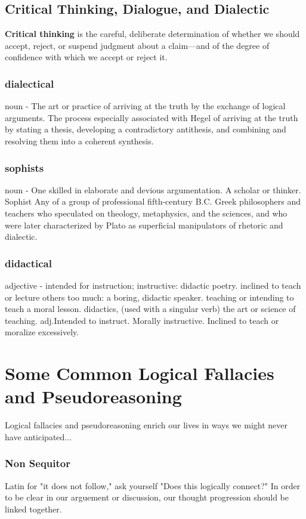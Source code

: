 \subsection{Critical Thinking, Dialogue, and Dialectic}

\textbf{Critical thinking} is the careful, deliberate determination of whether we should accept, reject, or suspend judgment about a claim---and of the degree of confidence with which we accept or reject it.

\subsubsection{dialectical}
noun - The art or practice of arriving at the truth by the exchange of logical arguments.
The process especially associated with Hegel of arriving at the truth by stating a thesis, developing a contradictory antithesis, and combining and resolving them into a coherent synthesis.
\subsubsection{sophists}
noun - One skilled in elaborate and devious argumentation. A scholar or thinker.
Sophist Any of a group of professional fifth-century B.C. Greek philosophers and teachers who speculated on theology, metaphysics, and the sciences, and who were later characterized by Plato as superficial manipulators of rhetoric and dialectic.
\subsubsection{didactical}
adjective - intended for instruction; instructive: didactic poetry.
inclined to teach or lecture others too much: a boring, didactic speaker.	teaching or intending to teach a moral lesson. didactics, (used with a singular verb) the art or science of teaching.
adj.Intended to instruct. Morally instructive. Inclined to teach or moralize excessively.

\section{Some Common Logical Fallacies and Pseudoreasoning}

Logical fallacies and pseudoreasoning enrich our lives in ways we might never have anticipated...

\subsubsection{Non Sequitor}
Latin for "it does not follow," ask yourself "Does this logically connect?" In order to be clear in our arguement or discussion, our thought progression should be linked together. 

